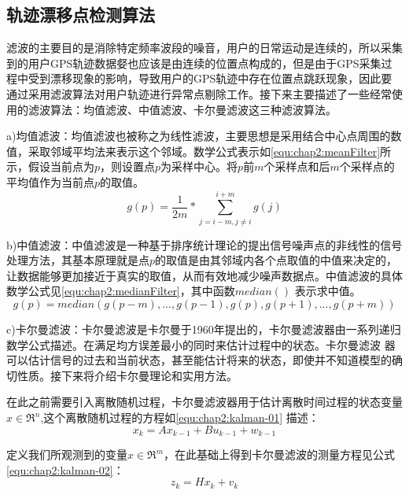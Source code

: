 \subsection{轨迹漂移点检测算法}
\label{sec:section2-1-1}
滤波的主要目的是消除特定频率波段的噪音，用户的日常运动是连续的，所以采集到的用户GPS轨迹数据㛑也应该是由连续的位置点构成的，但是由于GPS采集过程中受到漂移现象的影响，导致用户的GPS轨迹中存在位置点跳跃现象，因此要通过采用滤波算法对用户轨迹进行异常点剔除工作。接下来主要描述了一些经常使用的滤波算法：均值滤波、中值滤波、卡尔曼滤波这三种滤波算法。
\par a)均值滤波：均值滤波也被称之为线性滤波，主要思想是采用结合中心点周围的数值，采取邻域平均法来表示这个邻域。数学公式表示如\ref{equ:chap2:meanFilter}所示，假设当前点为$p$，则设置点$p$为采样中心。将$p$前$m$个采样点和后$m$个采样点的平均值作为当前点$p$的取值。
\begin{equation}
\label{equ:chap2:meanFilter}
g(p)=\frac{1}{2m} \ast \sum_{j=i-m,j\neq i}^{i+m}g(j)
\end{equation}
\par b)中值滤波：中值滤波是一种基于排序统计理论的提出信号噪声点的非线性的信号处理方法，其基本原理就是点$p$的取值是由其邻域内各个点取值的中值来决定的，让数据能够更加接近于真实的取值，从而有效地减少噪声数据点。中值滤波的具体数学公式见\ref{equ:chap2:medianFilter}，其中函数$median()$ 表示求中值。
\begin{equation}
\label{equ:chap2:medianFilter}
g(p)=median({g(p-m),...,g(p-1),g(p),g(p+1),...,g(p+m)})
\end{equation}
\par c)卡尔曼滤波：卡尔曼滤波是卡尔曼于1960年提出的，卡尔曼滤波器由一系列递归数学公式描述。在满足均方误差最小的同时来估计过程中的状态。卡尔曼滤波
器可以估计信号的过去和当前状态，甚至能估计将来的状态，即使并不知道模型的确切性质。接下来将介绍卡尔曼理论和实用方法。
\par 在此之前需要引入离散随机过程，卡尔曼滤波器用于估计离散时间过程的状态变量$x\in \Re^{n}$,这个离散随机过程的方程如\ref{equ:chap2:kalman-01} 描述：
\begin{equation}
\label{equ:chap2:kalman-01}
x_{k}=Ax_{k-1}+Bu_{k-1}+w_{k-1}
\end{equation}
\par 定义我们所观测到的变量$x\in \Re^{m}$，在此基础上得到卡尔曼滤波的测量方程见公式\ref{equ:chap2:kalman-02}：
\begin{equation}
\label{equ:chap2:kalman-02}
z_{k}=Hx_{k}+v_{k}
\end{equation}

